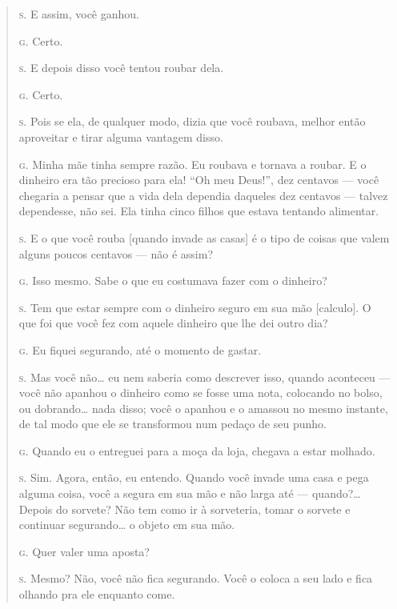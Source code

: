 \begin{quote}
\noindent\hskip0mm\textsc{s.} E assim, você ganhou.

\noindent\hskip0mm\textsc{g.} Certo.

\noindent\hskip0mm\textsc{s.} E depois disso você tentou roubar dela.

\noindent\hskip0mm\textsc{g.} Certo.

\noindent\hskip0mm\textsc{s.} Pois se ela, de qualquer modo, dizia que você roubava, melhor então
aproveitar e tirar alguma vantagem disso.

\noindent\hskip0mm\textsc{g.} Minha mãe tinha sempre razão. Eu roubava e tornava a roubar. E o
dinheiro era tão precioso para ela! ``Oh meu
Deus!'', dez centavos --- você chegaria a pensar que a
vida dela dependia daqueles dez centavos --- talvez dependesse, não
sei. Ela tinha cinco filhos que estava tentando alimentar.

\noindent\hskip0mm\textsc{s.} E o que você rouba [quando invade as casas] é o tipo de coisas que
valem alguns poucos centavos --- não é assim?

\noindent\hskip0mm\textsc{g.} Isso mesmo. Sabe o que eu costumava fazer com o dinheiro?

\noindent\hskip0mm\textsc{s.} Tem que estar sempre com o dinheiro seguro em sua mão [calculo]. O
que foi que você fez com aquele dinheiro que lhe dei outro dia?

\noindent\hskip0mm\textsc{g.} Eu fiquei segurando, até o momento de gastar.

\noindent\hskip0mm\textsc{s.} Mas você não\ldots{} eu nem saberia como descrever isso, quando aconteceu
 --- você não apanhou o dinheiro como se fosse uma nota, colocando no
bolso, ou dobrando\ldots{} nada disso; você o apanhou e o amassou no mesmo
instante, de tal modo que ele se transformou num pedaço de seu punho.

\noindent\hskip0mm\textsc{g.} Quando eu o entreguei para a moça da loja, chegava a estar molhado.

\noindent\hskip0mm\textsc{s.} Sim. Agora, então, eu entendo. Quando você invade uma casa e pega
alguma coisa, você a segura em sua mão e não larga até --- quando?\ldots{}
Depois do sorvete? Não tem como ir à sorveteria, tomar o sorvete e
continuar segurando\ldots{} o objeto em sua mão.

\noindent\hskip0mm\textsc{g.} Quer valer uma aposta?

\noindent\hskip0mm\textsc{s.} Mesmo? Não, você não fica segurando. Você o coloca a seu lado e fica
olhando pra ele enquanto come.


\end{quote}
